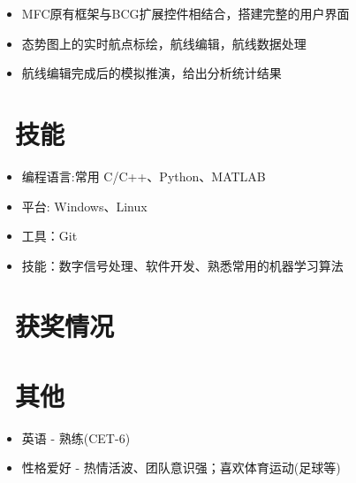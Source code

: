 \documentclass{resume}
\begin{document}
\begin{itemize}[topsep = 0 pt, partopsep = 0pt]
  \item MFC原有框架与BCG扩展控件相结合，搭建完整的用户界面
  \item 态势图上的实时航点标绘，航线编辑，航线数据处理
  \item 航线编辑完成后的模拟推演，给出分析统计结果
\end{itemize}



\section{\faCogs\ 技能}
\begin{itemize}[parsep=0.5ex]
  \item 编程语言:常用 C/C++、Python、MATLAB  
  \item 平台: Windows、Linux
  \item 工具：Git
  \item 技能：数字信号处理、软件开发、熟悉常用的机器学习算法
\end{itemize}

\section{\faHeartO\ 获奖情况}

\section{\faInfo\ 其他}
\begin{itemize}[parsep=0.5ex]
  \item  英语 - 熟练(CET-6)
  \item  性格爱好 - 热情活波、团队意识强；喜欢体育运动(足球等)
\end{itemize}
\end{document}
